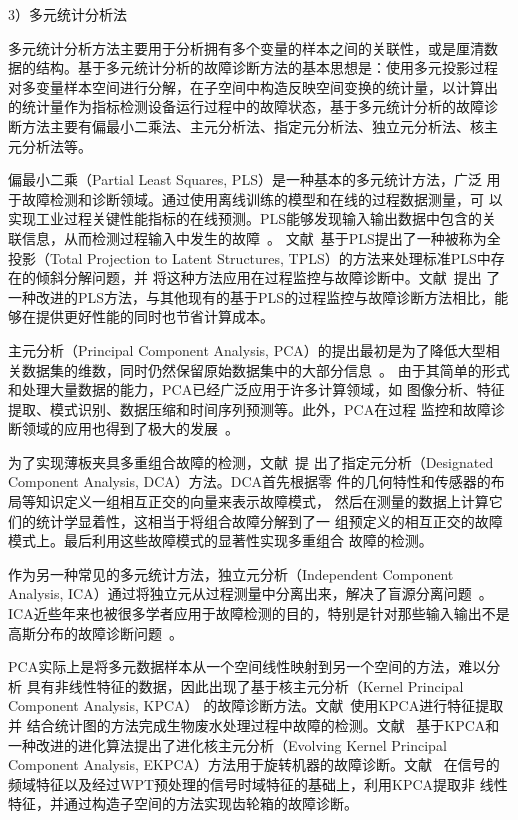 3）多元统计分析法

多元统计分析方法主要用于分析拥有多个变量的样本之间的关联性，或是厘清数
据的结构。基于多元统计分析的故障诊断方法的基本思想是：使用多元投影过程
对多变量样本空间进行分解，在子空间中构造反映空间变换的统计量，以计算出
的统计量作为指标检测设备运行过程中的故障状态，基于多元统计分析的故障诊
断方法主要有偏最小二乘法、主元分析法、指定元分析法、独立元分析法、核主
元分析法等。

偏最小二乘（Partial Least Squares, PLS）是一种基本的多元统计方法，广泛
用于故障检测和诊断领域。通过使用离线训练的模型和在线的过程数据测量，可
以实现工业过程关键性能指标的在线预测。PLS能够发现输入输出数据中包含的关
联信息，从而检测过程输入中发生的故障~\cite{li2010geometric, zhang2010decentralized, muradore2012pls}。
文献~基于PLS提出了一种被称为全投影（Total Projection
to Latent Structures, TPLS）的方法来处理标准PLS中存在的倾斜分解问题，并
将这种方法应用在过程监控与故障诊断中。文献~提出
了一种改进的PLS方法，与其他现有的基于PLS的过程监控与故障诊断方法相比，能
够在提供更好性能的同时也节省计算成本。

主元分析（Principal Component Analysis, PCA）的提出最初是为了降低大型相
关数据集的维数，同时仍然保留原始数据集中的大部分信息~\cite{abdi2010principal}。
由于其简单的形式和处理大量数据的能力，PCA已经广泛应用于许多计算领域，如
图像分析、特征提取、模式识别、数据压缩和时间序列预测等。此外，PCA在过程
监控和故障诊断领域的应用也得到了极大的发展~\cite{joe2003statistical, gertler2004pca, choqueuse2012diagnosis}。

为了实现薄板夹具多重组合故障的检测，文献~提
出了指定元分析（Designated Component Analysis, DCA）方法。DCA首先根据零
件的几何特性和传感器的布局等知识定义一组相互正交的向量来表示故障模式，
然后在测量的数据上计算它们的统计学显着性，这相当于将组合故障分解到了一
组预定义的相互正交的故障模式上。最后利用这些故障模式的显著性实现多重组合
故障的检测。

作为另一种常见的多元统计方法，独立元分析（Independent Component Analysis,
ICA）通过将独立元从过程测量中分离出来，解决了盲源分离问题~\cite{hyvarinen2004independent}。
ICA近些年来也被很多学者应用于故障检测的目的，特别是针对那些输入输出不是
高斯分布的故障诊断问题~\cite{kano2003monitoring, lee2004statistical}。

PCA实际上是将多元数据样本从一个空间线性映射到另一个空间的方法，难以分析
具有非线性特征的数据，因此出现了基于核主元分析（Kernel Principal Component Analysis, KPCA）
的故障诊断方法。文献~使用KPCA进行特征提取并
结合统计图的方法完成生物废水处理过程中故障的检测。文献~
基于KPCA和一种改进的进化算法提出了进化核主元分析（Evolving Kernel Principal
Component Analysis, EKPCA）方法用于旋转机器的故障诊断。文献~
在信号的频域特征以及经过WPT预处理的信号时域特征的基础上，利用KPCA提取非
线性特征，并通过构造子空间的方法实现齿轮箱的故障诊断。

